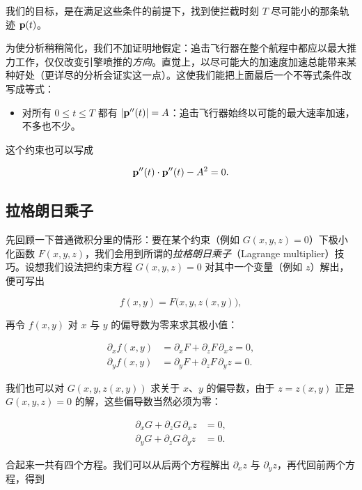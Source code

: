 我们的目标，是在满足这些条件的前提下，找到使拦截时刻 $T$ 尽可能小的那条轨迹 $\mathbf{p}(t)$。

为使分析稍稍简化，我们不加证明地假定：追击飞行器在整个航程中都应以最大推力工作，仅仅改变引擎喷推的\emph{方向}。直觉上，以尽可能大的加速度加速总能带来某种好处（更详尽的分析会证实这一点）。这使我们能把上面最后一个不等式条件改写成等式：

\begin{itemize}
  \item 对所有 $0\le t\le T$ 都有 $|\mathbf{p}''(t)|=A$：追击飞行器始终以可能的最大速率加速，不多也不少。
\end{itemize}

这个约束也可以写成

\begin{equation}
\mathbf{p}''(t)\cdot\mathbf{p}''(t)-A^{2}=0 .
\end{equation}

\subsection{拉格朗日乘子}

先回顾一下普通微积分里的情形：要在某个约束（例如 $G(x,y,z)=0$）下极小化函数 $F(x,y,z)$，我们会用到所谓的\emph{拉格朗日乘子}（Lagrange multiplier）技巧。设想我们设法把约束方程 $G(x,y,z)=0$ 对其中一个变量（例如 $z$）解出，便可写出

\begin{equation}
f(x,y)=F\bigl(x,y,z(x,y)\bigr),
\end{equation}

再令 $f(x,y)$ 对 $x$ 与 $y$ 的偏导数为零来求其极小值：

\begin{align}
\partial_{x} f(x,y) &= \partial_{x}F + \partial_{z}F\,\partial_{x}z = 0, \\
\partial_{y} f(x,y) &= \partial_{y}F + \partial_{z}F\,\partial_{y}z = 0 .
\end{align}

我们也可以对 $G(x,y,z(x,y))$ 求关于 $x$、$y$ 的偏导数，由于 $z=z(x,y)$ 正是 $G(x,y,z)=0$ 的解，这些偏导数当然必须为零：

\begin{align}
\partial_{x}G + \partial_{z}G\,\partial_{x}z &= 0, \\
\partial_{y}G + \partial_{z}G\,\partial_{y}z &= 0 .
\end{align}

合起来一共有四个方程。我们可以从后两个方程解出 $\partial_{x}z$ 与 $\partial_{y}z$，再代回前两个方程，得到


